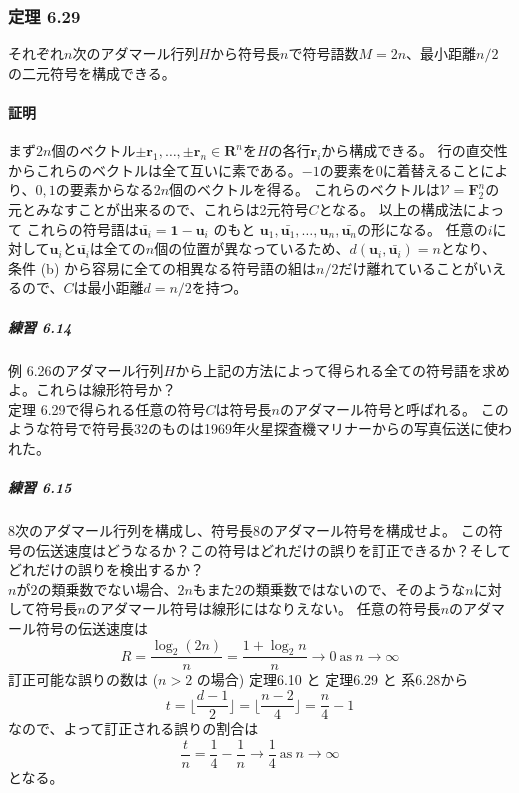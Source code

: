 \documentclass[12pt,a4paper]{article}
\begin{document}
    \subsubsection*{定理 6.29}
      それぞれ$n$次のアダマール行列$H$から符号長$n$で符号語数$M = 2n$、最小距離$n/2$の二元符号を構成できる。

      \paragraph{証明}
        まず$2n$個のベクトル$\pm\mathbf{r}_1 , \ldots , \pm\mathbf{r}_n \in \mathbf{R}^n$を$H$の各行$\mathbf{r}_i$から構成できる。
        行の直交性からこれらのベクトルは全て互いに素である。$-1$の要素を$0$に着替えることにより、$0, 1$の要素からなる$2n$個のベクトルを得る。
        これらのベクトルは$\mathcal{V} = \mathbf{F}_2^n$の元とみなすことが出来るので、これらは2元符号$C$となる。
        以上の構成法によって
        これらの符号語は$\bar{\mathbf{u}_i} = \mathbf{1} - \mathbf{u}_i$ のもと $\mathbf{u}_1, \bar{\mathbf{u}_1}, \ldots , \mathbf{u}_n, \bar{\mathbf{u}_n}$の形になる。
        任意の$i$に対して$\mathbf{u}_i$と$\bar{\mathbf{u}_i}$は全ての$n$個の位置が異なっているため、$d(\mathbf{u}_i, \bar{\mathbf{u}_i}) = n$となり、
        条件 (b) から容易に全ての相異なる符号語の組は$n/2$だけ離れていることがいえるので、$C$は最小距離$d = n / 2$を持つ。

        \subparagraph{練習 6.14}
          例 6.26のアダマール行列$H$から上記の方法によって得られる全ての符号語を求めよ。これらは線形符号か？ \\

    定理 6.29で得られる任意の符号$C$は符号長$n$のアダマール符号と呼ばれる。
    このような符号で符号長$32$のものは1969年火星探査機マリナーからの写真伝送に使われた。

        \subparagraph{練習 6.15}
          $8$次のアダマール行列を構成し、符号長$8$のアダマール符号を構成せよ。
          この符号の伝送速度はどうなるか？この符号はどれだけの誤りを訂正できるか？そしてどれだけの誤りを検出するか？ \\

    $n$が$2$の類乗数でない場合、$2n$もまた$2$の類乗数ではないので、そのような$n$に対して符号長$n$のアダマール符号は線形にはなりえない。
    任意の符号長$n$のアダマール符号の伝送速度は
    \[ R = \frac{\log_2 (2n)}{n} = \frac{1 + \log_2 n}{n} \rightarrow 0 \ \text{as} \ n \rightarrow \infty \]
    訂正可能な誤りの数は ($n > 2$ の場合) 定理6.10 と 定理6.29 と 系6.28から
    \[t = \lfloor \frac{d-1}{2} \rfloor = \lfloor \frac{n -2}{4} \rfloor = \frac n4 - 1 \]
    なので、よって訂正される誤りの割合は
    \[ \frac tn = \frac 14 - \frac 1n \rightarrow \frac 14 \ \text{as} \ n \rightarrow \infty \]
    となる。
\end{document}
